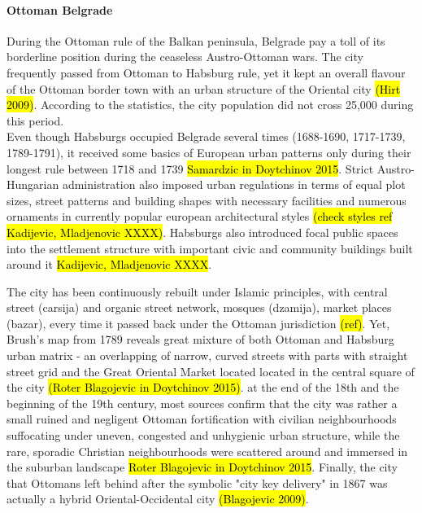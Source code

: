 \documentclass[11pt]{report}
\begin{document}
\paragraph{Ottoman Belgrade}
During the Ottoman rule of the Balkan peninsula, Belgrade pay a toll of its borderline position during the ceaseless Austro-Ottoman wars. The city frequently passed from Ottoman to Habsburg rule, yet it kept an overall flavour of the Ottoman border town with an urban structure of the Oriental city \hl{(Hirt 2009)}. According to the statistics, the city population did not cross 25,000 during this period.
\\
Even though Habsburgs occupied Belgrade several times
(1688-1690, 1717-1739, 1789-1791), it received some basics of European urban patterns only during their longest rule between 1718 and 1739 \hl{Samardzic in Doytchinov 2015}. Strict Austro-Hungarian administration also imposed urban regulations in terms of equal plot sizes, street patterns and building shapes with necessary facilities and numerous ornaments in currently popular european architectural styles \hl{(check styles ref Kadijevic, Mladjenovic XXXX)}. Habsburgs also introduced focal public spaces into the settlement structure with important civic and community buildings built around it \hl{Kadijevic, Mladjenovic XXXX}.

The city has been continuously rebuilt under Islamic principles, with central street (carsija) and organic street network, mosques (dzamija), market places (bazar), every time it passed back under the Ottoman jurisdiction \hl{(ref)}. Yet, Brush’s map from 1789 reveals great mixture of both Ottoman and Habsburg urban matrix - an overlapping of narrow, curved streets with parts with straight street grid and the Great Oriental Market located located in the central square of the city \hl{(Roter Blagojevic in Doytchinov 2015)}. at the end of the 18th and the beginning of the 19th century, most sources confirm that the city was rather a small ruined and negligent Ottoman fortification with civilian neighbourhoods suffocating under uneven, congested and unhygienic urban structure, while the rare, sporadic Christian neighbourhoods were scattered around and immersed in the suburban landscape \hl{Roter Blagojevic in Doytchinov 2015}. Finally, the city that Ottomans left behind after the symbolic "city key delivery" in 1867 was actually a hybrid Oriental-Occidental city \hl{(Blagojevic 2009)}.
\end{document}
